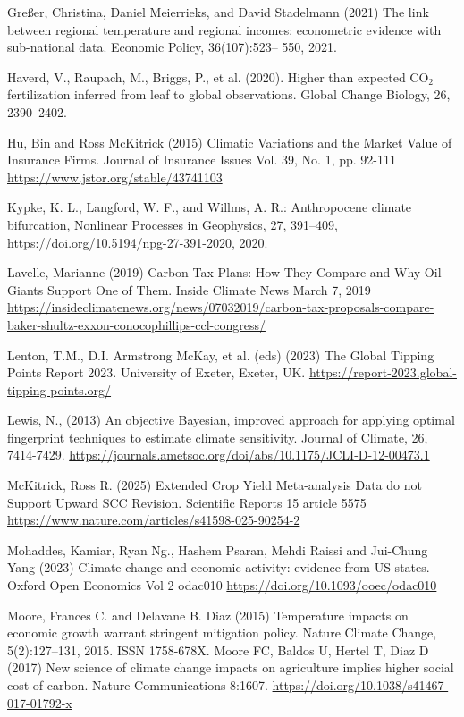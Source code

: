 \documentclass[12pt,paper=a4,DIV=12,parskip=never,chapterprefix=false,headings=standardclasses]{scrreprt}
\begin{document}
Greßer, Christina, Daniel Meierrieks, and David Stadelmann (2021) The link between regional temperature
and regional incomes: econometric evidence with sub-national data. Economic Policy, 36(107):523–
550, 2021.

Haverd, V., Raupach, M., Briggs, P., et al. (2020). Higher than expected CO$_2$ fertilization inferred from
leaf to global observations. Global Change Biology, 26, 2390–2402.

Hu, Bin and Ross McKitrick (2015) Climatic Variations and the Market Value of Insurance Firms.
Journal of Insurance Issues Vol. 39, No. 1, pp. 92-111 \url{https://www.jstor.org/stable/43741103}

Kypke, K. L., Langford, W. F., and Willms, A. R.: Anthropocene climate bifurcation, Nonlinear Processes
in Geophysics, 27, 391–409, \url{https://doi.org/10.5194/npg-27-391-2020}, 2020.

Lavelle, Marianne (2019) Carbon Tax Plans: How They Compare and Why Oil Giants Support One of
Them. Inside Climate News March 7, 2019 \url{https://insideclimatenews.org/news/07032019/carbon-tax-proposals-compare-baker-shultz-exxon-conocophillips-ccl-congress/}

Lenton, T.M., D.I. Armstrong McKay, et al. (eds) (2023) The Global Tipping Points Report 2023.
University of Exeter, Exeter, UK. \url{https://report-2023.global-tipping-points.org/}

Lewis, N., (2013) An objective Bayesian, improved approach for applying optimal fingerprint techniques
to estimate climate sensitivity. Journal of Climate, 26, 7414-7429.
\url{https://journals.ametsoc.org/doi/abs/10.1175/JCLI-D-12-00473.1}

McKitrick, Ross R. (2025) Extended Crop Yield Meta-analysis Data do not Support Upward SCC
Revision. Scientific Reports 15 article 5575 \url{https://www.nature.com/articles/s41598-025-90254-2}

Mohaddes, Kamiar, Ryan Ng., Hashem Psaran, Mehdi Raissi and Jui-Chung Yang (2023) Climate change
and economic activity: evidence from US states. Oxford Open Economics Vol 2 odac010
\url{https://doi.org/10.1093/ooec/odac010}

Moore, Frances C. and Delavane B. Diaz (2015) Temperature impacts on economic growth warrant
stringent mitigation policy. Nature Climate Change, 5(2):127–131, 2015. ISSN 1758-678X.
Moore FC, Baldos U, Hertel T, Diaz D (2017) New science of climate change impacts on agriculture
implies higher social cost of carbon. Nature Communications 8:1607. \url{https://doi.org/10.1038/s41467-017-01792-x}
\end{document}
